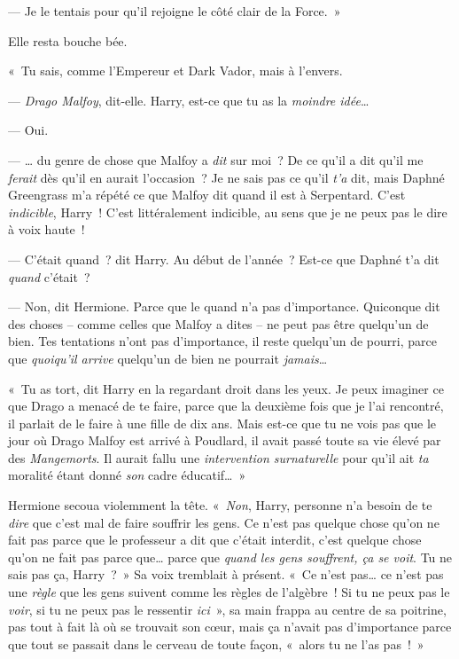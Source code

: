 --- Je le tentais pour qu'il rejoigne le côté clair de la Force.~»

Elle resta bouche bée.

«~Tu sais, comme l'Empereur et Dark Vador, mais à l'envers.

--- \emph{Drago Malfoy}, dit-elle. Harry, est-ce que tu as la \emph{moindre idée}…

--- Oui.

--- … du genre de chose que Malfoy a \emph{dit} sur moi~? De ce qu'il a dit qu'il me \emph{ferait} dès qu'il en aurait l'occasion~? Je ne sais pas ce qu'il \emph{t'a} dit, mais Daphné Greengrass m'a répété ce que Malfoy dit quand il est à Serpentard. C'est \emph{indicible}, Harry~! C'est littéralement indicible, au sens que je ne peux pas le dire à voix haute~!

--- C'était quand~? dit Harry. Au début de l'année~? Est-ce que Daphné t'a dit \emph{quand} c'était~?

--- Non, dit Hermione. Parce que le quand n'a pas d'importance. Quiconque dit des choses -- comme celles que Malfoy a dites -- ne peut pas être quelqu'un de bien. Tes tentations n'ont pas d'importance, il reste quelqu'un de pourri, parce que \emph{quoiqu'il arrive} quelqu'un de bien ne pourrait \emph{jamais}…

«~Tu as tort, dit Harry en la regardant droit dans les yeux. Je peux imaginer ce que Drago a menacé de te faire, parce que la deuxième fois que je l'ai rencontré, il parlait de le faire à une fille de dix ans. Mais est-ce que tu ne vois pas que le jour où Drago Malfoy est arrivé à Poudlard, il avait passé toute sa vie élevé par des \emph{Mangemorts}. Il aurait fallu une \emph{intervention surnaturelle} pour qu'il ait \emph{ta} moralité étant donné \emph{son} cadre éducatif…~»

Hermione secoua violemment la tête. «~\emph{Non}, Harry, personne n'a besoin de te \emph{dire} que c'est mal de faire souffrir les gens. Ce n'est pas quelque chose qu'on ne fait pas parce que le professeur a dit que c'était interdit, c'est quelque chose qu'on ne fait pas parce que… parce que \emph{quand les gens souffrent, ça se voit}. Tu ne sais pas ça, Harry~?~» Sa voix tremblait à présent. «~Ce n'est pas… ce n'est pas une \emph{règle} que les gens suivent comme les règles de l'algèbre~! Si tu ne peux pas le \emph{voir}, si tu ne peux pas le ressentir \emph{ici}~», sa main frappa au centre de sa poitrine, pas tout à fait là où se trouvait son cœur, mais ça n'avait pas d'importance parce que tout se passait dans le cerveau de toute façon, «~alors tu ne l'as pas~!~»

